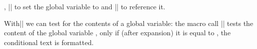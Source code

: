 \begin{function}{\setSGvar,\useSGvar}
  || to set the global variable  to
   and || to reference it.
\end{function}
  
\begin{function}{\ifSGvar}
  With|\ifSGvar| we can test for the contents of a global variable: the macro call
  || tests the content of the global
  variable , only if (after expansion) it is equal to , the
  conditional text  is formatted.
\end{function}


